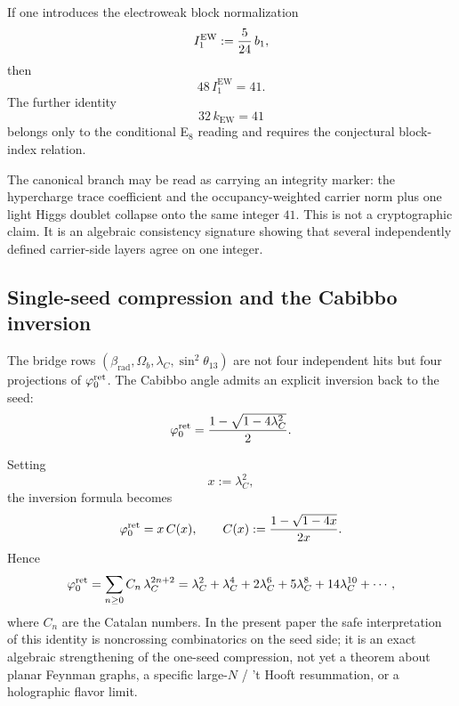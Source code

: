 \begin{remark}
If one introduces the electroweak block normalization
\[
I_1^{\mathrm{EW}}:=\frac{5}{24}\,b_1,
\]
then
\[
48\,I_1^{\mathrm{EW}}=41.
\]
The further identity
\[
32\,k_{\mathrm{EW}}=41
\]
belongs only to the conditional E$_8$ reading and requires the conjectural block-index relation.
\end{remark}

\begin{remark}
The canonical branch may be read as carrying an integrity marker: the hypercharge trace coefficient and the occupancy-weighted carrier norm plus one light Higgs doublet collapse onto the same integer $41$. This is not a cryptographic claim. It is an algebraic consistency signature showing that several independently defined carrier-side layers agree on one integer.
\end{remark}

\subsection{Single-seed compression and the Cabibbo inversion}

The bridge rows $(\beta_{\mathrm{rad}},\Omega_b,\lambda_C,\sin^2\theta_{13})$ are not four independent hits but four projections of $\varphi_0^{\mathrm{ret}}$. The Cabibbo angle admits an explicit inversion back to the seed:
\begin{equation}
\label{eq:cabibbo-inversion}
\varphi_0^{\mathrm{ret}}=\frac{1-\sqrt{1-4\lambda_C^2}}{2}.
\end{equation}
\begin{remark}
Setting
\[
x:=\lambda_C^2,
\]
the inversion formula becomes
\[
\varphi_0^{\mathrm{ret}}=x\,C(x),
\qquad
C(x):=\frac{1-\sqrt{1-4x}}{2x}.
\]
Hence
\begin{equation}
\label{eq:catalan-cabibbo}
\varphi_0^{\mathrm{ret}}
=
\sum_{n\ge 0} C_n\,\lambda_C^{2n+2}
=
\lambda_C^2+\lambda_C^4+2\lambda_C^6+5\lambda_C^8+14\lambda_C^{10}+\cdots,
\end{equation}
where $C_n$ are the Catalan numbers. In the present paper the safe interpretation of this identity is noncrossing combinatorics on the seed side; it is an exact algebraic strengthening of the one-seed compression, not yet a theorem about planar Feynman graphs, a specific large-$N$ / 't Hooft resummation, or a holographic flavor limit.
\end{remark}

